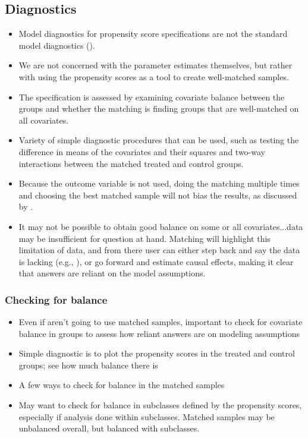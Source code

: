\documentclass[11pt,titlepage]{article}
\begin{document}
\subsection{Diagnostics}
\begin{itemize}
\item Model diagnostics for propensity score specifications are not the standard model diagnostics (\cite{Rubin04}).  
\item We are not concerned with the parameter estimates themselves, but rather with using the propensity scores as a tool to create well-matched samples. 
\item The specification is assessed by examining covariate balance between the groups and whether the matching is finding groups that are well-matched on all covariates.  
\item Variety of simple diagnostic procedures that can be used, such as testing the difference in means of the covariates and their squares and two-way interactions
between the matched treated and control groups.
\item Because the outcome variable is not used, doing the matching multiple times and choosing the best matched sample will not bias the results, as discussed by \cite{Greevy04}.
\item It may not be possible to obtain good balance on some or all covariates...data may be insufficient for question at hand.  Matching will highlight this
limitation of data, and from there user can either step back and say the data is lacking (e.g., \cite{Rubin01, AgoDyn04}), 
or go forward and estimate causal effects, making it clear that answers are reliant on the model assumptions.
\end{itemize}

\subsubsection{Checking for balance}
\begin{itemize}
\item Even if aren't going to use matched samples, important to check for covariate balance in groups to assess how reliant answers are on modeling assumptions
\item Simple diagnostic is to plot the propensity scores in the treated and control groups; see how much balance there is
\item A few ways to check for balance in the matched samples
\item May want to check for balance in subclasses defined by the propensity scores, especially if analysis done within subclasses.  Matched samples may be unbalanced
overall, but balanced with subclasses.
\end{itemize}
\end{document}

